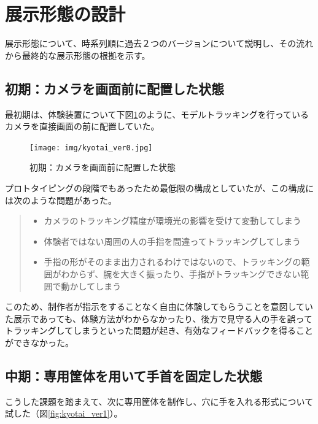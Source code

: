 \section{展示形態の設計}
展示形態について、時系列順に過去２つのバージョンについて説明し、その流れから最終的な展示形態の根拠を示す。

\subsection{初期：カメラを画面前に配置した状態}
最初期は、体験装置について下図\ref{fig:kyotai_ver0}のように、モデルトラッキングを行っているカメラを直接画面の前に配置していた。
\begin{figure}[H]
  \centering
  \texttt{[image: img/kyotai\_ver0.jpg]}
  \caption{初期：カメラを画面前に配置した状態}
  \label{fig:kyotai_ver0}
\end{figure}

プロトタイピングの段階でもあったため最低限の構成としていたが、この構成には次のような問題があった。
\begin{quote}
  \begin{itemize}
    \item カメラのトラッキング精度が環境光の影響を受けて変動してしまう
    \item 体験者ではない周囲の人の手指を間違ってトラッキングしてしまう
    \item 手指の形がそのまま出力されるわけではないので、トラッキングの範囲がわからず、腕を大きく振ったり、手指がトラッキングできない範囲で動かしてしまう
  \end{itemize}
\end{quote}

このため、制作者が指示をすることなく自由に体験してもらうことを意図していた展示であっても、体験方法がわからなかったり、後方で見守る人の手を誤ってトラッキングしてしまうといった問題が起き、有効なフィードバックを得ることができなかった。

\subsection{中期：専用筐体を用いて手首を固定した状態}
こうした課題を踏まえて、次に専用筐体を制作し、穴に手を入れる形式について試した（図\ref{fig:kyotai_ver1}）。

